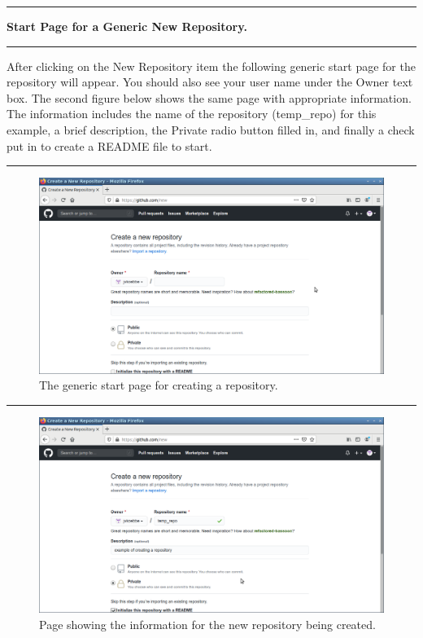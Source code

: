 \documentclass[10pt,fleqn]{article}
\begin{document}
\eject
\vskip0.1in\hrule\vskip0.1in\noindent
{\bf Start Page for a Generic New Repository.} 
\vskip0.1in\hrule\vskip0.1in\noindent
After clicking on the New Repository item the following generic start page for
the repository will appear. You should also see your user name under the Owner
text box. The second figure below shows the same page with appropriate
information. The information includes the name of the repository (temp\_repo)
for this example, a brief description, the Private radio button filled in, and
finally a check put in to create a README file to start.
\vskip0.1in\hrule\vskip0.1in
\vfill
\begin{figure}[h]
\centering
\includegraphics[width=5.0in]{../images/github_07.png}
\caption{The generic start page for creating a repository.} 
\end{figure}
\vskip0.1in\hrule\vskip0.1in
\vfill
\begin{figure}[h]
\centering
\includegraphics[width=5.0in]{../images/github_08.png}
\caption{Page showing the information for the new repository being created.} 
\end{figure}
\end{document}
